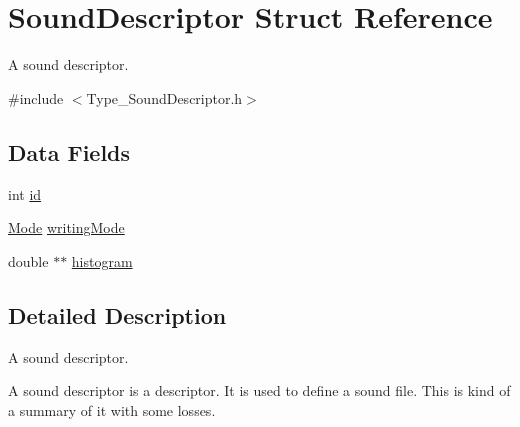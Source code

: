 \hypertarget{structSoundDescriptor}{\section{Sound\-Descriptor Struct Reference}
\label{structSoundDescriptor}
}


A sound descriptor.  




{\ttfamily \#include $<$Type\-\_\-\-Sound\-Descriptor.\-h$>$}

\subsection*{Data Fields}
\begin{DoxyCompactItemize}
\item 
int \hyperlink{structSoundDescriptor_a0e74167c9c85b5696a4b64dd16af30c6}{id}
\item 
\hyperlink{Type__WritingMode_8h_a46c8a310cf4c094f8c80e1cb8dc1f911}{Mode} \hyperlink{structSoundDescriptor_a6bda0da57e7a82c0e7c20b22f26b6c1c}{writing\-Mode}
\item 
double $\ast$$\ast$ \hyperlink{structSoundDescriptor_a677e9fb3556058648bf4f114e81abc8f}{histogram}
\end{DoxyCompactItemize}


\subsection{Detailed Description}
A sound descriptor. 

A sound descriptor is a descriptor. It is used to define a sound file. This is kind of a summary of it with some losses. 


